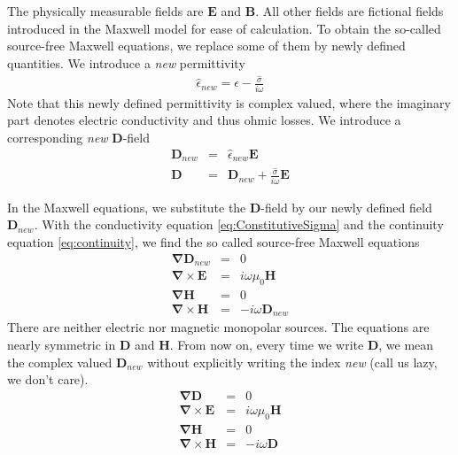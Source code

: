 \documentclass[12pt,a4paper,twoside,openright,BCOR10mm,headsepline,titlepage,abstracton,chapterprefix,final]{scrreprt}
\newcommand\Vector[1]{{\mathbf{#1}}}
\newcommand\vacuum{0}
\newcommand\Nabla{\Vector{\nabla}}
\newcommand\Tensor[1]{\hat{#1}}
\newcommand\scalarEfield{E}
\newcommand\scalarBfield{B}
\newcommand\scalarHfield{H}
\newcommand\scalarDfield{D}
\newcommand\Efield{\Vector{\scalarEfield}}
\newcommand\Bfield{\Vector{\scalarBfield}}
\newcommand\Hfield{\Vector{\scalarHfield}}
\newcommand\Dfield{\Vector{\scalarDfield}}
\newcommand\vacuumpermeability{\mu_{\vacuum}}
\newcommand\permittivity{\Tensor{\epsilon}}
\newcommand\conductivity{\Tensor{\sigma}}
\begin{document}
The physically measurable fields are $\Efield$ and $\Bfield$. All other fields are fictional fields introduced in the Maxwell model for ease of calculation.
To obtain the so-called source-free Maxwell equations, we replace some of them by newly defined quantities.
We introduce a \emph{new} permittivity
\begin{eqnarray}
  \permittivity_{new} = \permittivity - \frac{\conductivity}{i \omega}
\end{eqnarray}
Note that this newly defined permittivity is complex valued, where the imaginary part denotes electric conductivity and thus ohmic losses.
We introduce a corresponding \emph{new} $\Dfield$-field
\begin{eqnarray}
  \Dfield_{new} &=& \permittivity_{new} \Efield \\
  \Dfield &=& \Dfield_{new} + \frac{\conductivity}{i \omega} \Efield
\end{eqnarray}

In the Maxwell equations, we substitute the $\Dfield$-field by our newly defined field $\Dfield_{new}$.
With the conductivity equation \ref{eq:ConstitutiveSigma} and the continuity equation \ref{eq:continuity}, we find the so called source-free Maxwell equations
\begin{subequations}
\begin{eqnarray}
  \Nabla \Dfield_{new} &=& 0 					\label{eq:divDsourcefree}\\
  \Nabla \times \Efield &=& i \omega \vacuumpermeability \Hfield	\\
  \Nabla \Hfield &=& 0  					\\
  \Nabla \times \Hfield &=& - i \omega \Dfield_{new}  		
\end{eqnarray}
\end{subequations}
There are neither electric nor magnetic monopolar sources.
The equations are nearly symmetric in $\Dfield$ and $\Hfield$.
From now on, every time we write $\Dfield$, we mean the complex valued $\Dfield_{new}$ without explicitly writing the index \emph{new} (call us lazy, we don't care).
\begin{subequations}
\begin{eqnarray}
  \Nabla \Dfield &=& 0 					\\
  \Nabla \times \Efield &=& i \omega \vacuumpermeability \Hfield	\\
  \Nabla \Hfield &=& 0  					\\
  \Nabla \times \Hfield &=& - i \omega \Dfield  		
\end{eqnarray}
\label{eq:sourcefreemaxwell}
\end{subequations}
\end{document}
